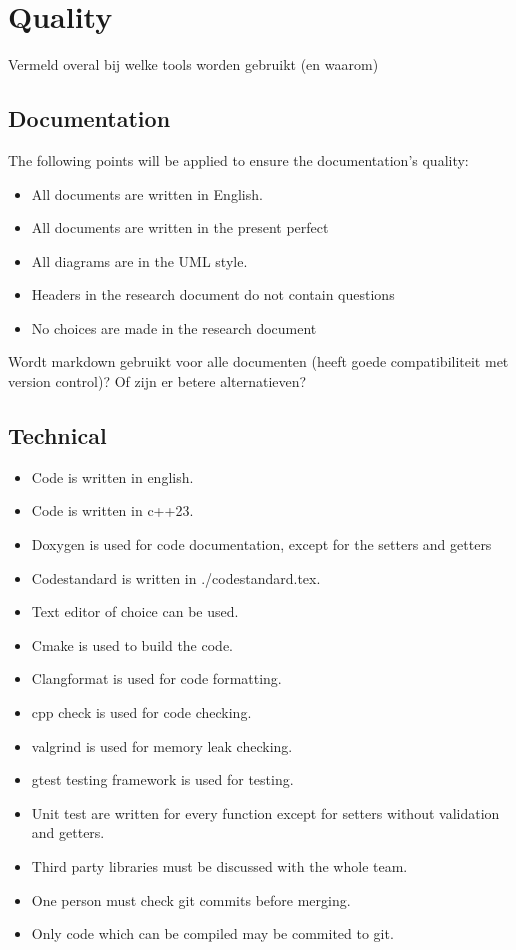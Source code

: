 \documentclass{article} %
\begin{document}
    \newpage

    \section{Quality}
    Vermeld overal bij welke tools worden gebruikt (en waarom)
    \subsection{Documentation}
    The following points will be applied to ensure the documentation’s quality:
    \begin{itemize}
        \item All documents are written in English.
        \item All documents are written in the present perfect
        \item All diagrams are in the UML style.
        \item Headers in the research document do not contain questions
        \item No choices are made in the research document
    \end{itemize}
    Wordt markdown gebruikt voor alle documenten (heeft goede compatibiliteit met version control)? Of zijn er betere alternatieven?
    \subsection{Technical}
    \begin{itemize}
        \item Code is written in english.
        \item Code is written in c++23.
        \item Doxygen is used for code documentation, except for the setters and getters
        \item Codestandard is written in ./codestandard.tex.
        \item Text editor of choice can be used.
        \item Cmake is used to build the code.
        \item Clangformat is used for code formatting.
        \item cpp check is used for code checking.
        \item valgrind is used for memory leak checking.
        \item gtest testing framework is used for testing.
        \item Unit test are written for every function except for setters without validation and getters.
        \item Third party libraries must be discussed with the whole team.
        \item One person must check git commits before merging.
        \item Only code which can be compiled may be commited to git.
    \end{itemize}
\end{document}
